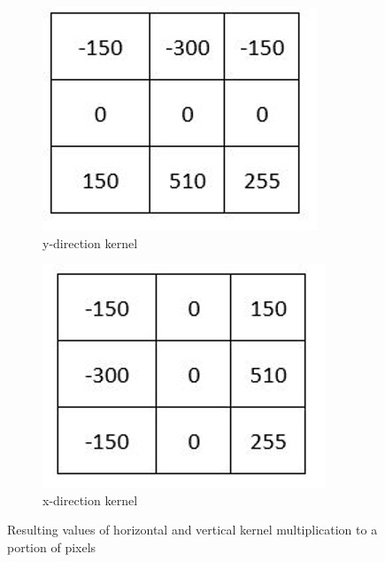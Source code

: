 \documentclass[conference]{IEEEtran}
\begin{document}
\begin{figure}[ht]
  \centering
  \begin{subfigure}[b]{0.45\linewidth}
    \includegraphics[width=\linewidth]{images/Picture13.png}
    \caption{y-direction kernel}
  \end{subfigure}
  \begin{subfigure}[b]{0.45\linewidth}
    \includegraphics[width=\linewidth]{images/Picture14.png}
    \caption{x-direction kernel}
  \end{subfigure}
  \caption{Resulting values of horizontal and vertical kernel multiplication to a portion of pixels \cite{b12}}
  \label{fig:combined4}
  
\end{figure}
\end{document}
